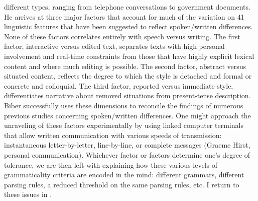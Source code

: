 different types, ranging from telephone conversations to government documents. He arrives at three major factors that account for much of the variation on 41 linguistic features that have been suggested to reflect spoken/written differences. None of these factors correlates entirely with speech versus writing. The first factor, interactive versus edited text, separates texts with high personal involvement and real-time constraints from those that have highly explicit lexical content and where much editing is possible. The second factor, abstract versus situated content, reflects the degree to which the style is detached and formal or concrete and colloquial. The third factor, reported versus immediate style, differentiates narrative about removed situations from present-tense description. Biber successfully uses these dimensions to reconcile the findings of numerous previous studies concerning spoken/written differences. One might approach the unraveling of these factors experimentally by using linked computer terminals that allow written communication with various speeds of transmission: instantaneous letter-by-letter, line-by-line, or complete messages (Graeme Hirst, personal communication). Whichever factor or factors determine one's degree of tolerance, we are then left with explaining how these various levels of grammaticality criteria are encoded in the mind: different grammars, different parsing rules, a reduced threshold on the same parsing rules, etc. I return to these issues in .

